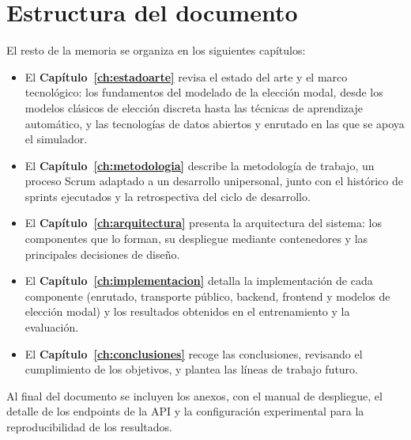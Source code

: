 \section{Estructura del documento}

El resto de la memoria se organiza en los siguientes capítulos:
\begin{itemize}
  \item El \textbf{Capítulo~\ref{ch:estadoarte}} revisa el estado del arte y el marco tecnológico: los fundamentos del modelado de la elección modal, desde los modelos clásicos de elección discreta hasta las técnicas de aprendizaje automático, y las tecnologías de datos abiertos y enrutado en las que se apoya el simulador.
  \item El \textbf{Capítulo~\ref{ch:metodologia}} describe la metodología de trabajo, un proceso Scrum adaptado a un desarrollo unipersonal, junto con el histórico de sprints ejecutados y la retrospectiva del ciclo de desarrollo.
  \item El \textbf{Capítulo~\ref{ch:arquitectura}} presenta la arquitectura del sistema: los componentes que lo forman, su despliegue mediante contenedores y las principales decisiones de diseño.
  \item El \textbf{Capítulo~\ref{ch:implementacion}} detalla la implementación de cada componente (enrutado, transporte público, backend, frontend y modelos de elección modal) y los resultados obtenidos en el entrenamiento y la evaluación.
  \item El \textbf{Capítulo~\ref{ch:conclusiones}} recoge las conclusiones, revisando el cumplimiento de los objetivos, y plantea las líneas de trabajo futuro.
\end{itemize}

Al final del documento se incluyen los anexos, con el manual de despliegue, el detalle de los endpoints de la API y la configuración experimental para la reproducibilidad de los resultados.